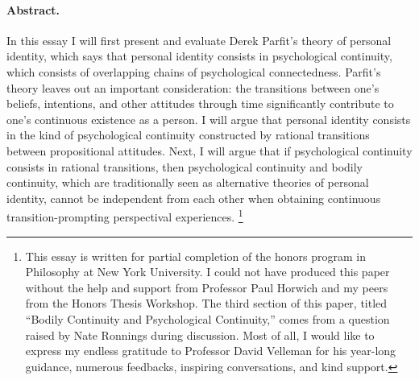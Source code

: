 \paragraph{\small Abstract.}

{
\small
In this essay I will first present and evaluate Derek Parfit's theory of
personal identity, which says that personal identity consists in
psychological continuity, which consists of overlapping chains of
psychological connectedness. Parfit's theory leaves out an important
consideration: the transitions between one's beliefs, intentions, and
other attitudes through time significantly contribute to one's
continuous existence as a person. I will argue that personal identity
consists in the kind of psychological continuity constructed by rational
transitions between propositional attitudes. Next, I will argue that if
psychological continuity consists in rational transitions, then
psychological continuity and bodily continuity, which are traditionally
seen as alternative theories of personal identity, cannot be independent
from each other when obtaining continuous transition-prompting
perspectival experiences. \footnote{This essay is
  written for partial completion of the honors program in Philosophy at
  New York University. I could not have produced this paper without the
  help and support from Professor Paul Horwich and my peers from the
  Honors Thesis Workshop. The third section of this paper, titled
  ``Bodily Continuity and Psychological Continuity,'' comes from a
  question raised by Nate Ronnings during discussion. Most of all, I
  would like to express my endless gratitude to Professor David Velleman
  for his year-long guidance, numerous feedbacks, inspiring
  conversations, and kind support.}
}

